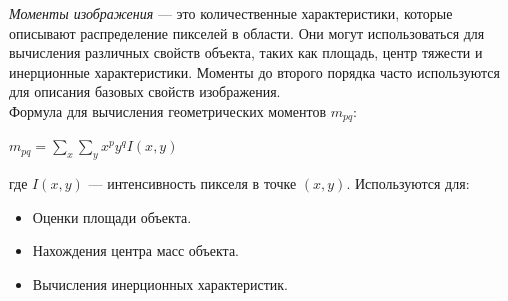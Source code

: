 		\textit{Моменты изображения} — это количественные характеристики, 
		которые описывают распределение пикселей в области. Они могут использоваться 
		для вычисления различных свойств объекта, таких как площадь, центр тяжести и 
		инерционные характеристики. Моменты до второго порядка часто используются для 
		описания базовых свойств изображения\cite{MGonsales}. \\
		Формула для вычисления геометрических моментов \( m_{pq} \):
		\begin{center}
			$m_{pq} = \sum_{x}\sum_{y} x^p y^q I(x, y)$
		\end{center}
		где \( I(x, y) \) — интенсивность пикселя в точке \((x, y)\).
		Используются для:
		\begin{itemize}
			\item Оценки площади объекта.
			\item Нахождения центра масс объекта.
			\item Вычисления инерционных характеристик.
		\end{itemize}

